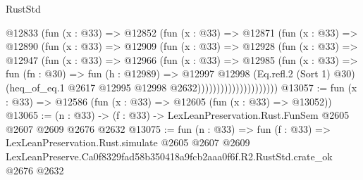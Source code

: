 \begin{lexlean}{RustStd}
\begin{coremodule}
                        @12833
                          (fun (x : @33) =>
                          @12852
                            (fun (x : @33) =>
                            @12871
                              (fun (x : @33) =>
                              @12890
                                (fun (x : @33) =>
                                @12909
                                  (fun (x : @33) =>
                                  @12928
                                    (fun (x : @33) =>
                                    @12947
                                      (fun (x : @33) =>
                                      @12966
                                        (fun (x : @33) =>
                                        @12985
                                          (fun (x : @33) =>
                                          fun (fn : @30) =>
                                          fun (h : @12989) =>
                                          @12997
                                            @12998
                                            (Eq.refl.{2} (Sort 1) @30)
                                            (heq_of_eq.{1}
                                              @2617
                                              @12995
                                              @12998
                                              @2632)))))))))))))))))))))
@13057 := fun (x : @33) => @12586 (fun (x : @33) => @12605 (fun (x : @33) => @13052))
@13065 := (n : @33) -> (f : @33) -> LexLeanPreservation.Rust.FunSem @2605 @2607 @2609 @2676 @2632
@13075 := fun (n : @33) =>
  fun (f : @33) =>
  LexLeanPreservation.Rust.simulate
    @2605
    @2607
    @2609
    LexLeanPreserve.Ca0f8329fad58b350418a9fcb2aaa0f6f.R2.RustStd.crate_ok
    @2676
    @2632
\end{coremodule}
\end{lexlean}
